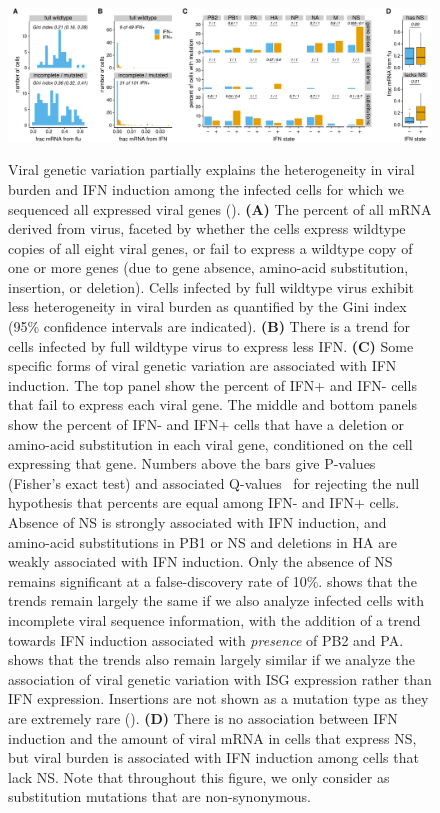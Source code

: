\documentclass[9pt,lineno]{elife}
\begin{document}
\begin{figure}
\begin{fullwidth}
{\centering
\includegraphics[width=\linewidth]{figures/single_cell_figures/p_mutations.pdf}
}
\caption{
Viral genetic variation partially explains the heterogeneity in viral burden and IFN induction among the infected cells for which we sequenced all expressed viral genes ().
{\bf (A)} 
The percent of all mRNA derived from virus, faceted by whether the cells express wildtype copies of all eight viral genes, or fail to express a wildtype copy of one or more genes (due to gene absence, amino-acid substitution, insertion, or deletion).
Cells infected by full wildtype virus exhibit less heterogeneity in viral burden as quantified by the Gini index (95\% confidence intervals are indicated).
{\bf (B)}
There is a trend for cells infected by full wildtype virus to express less IFN.
{\bf (C)}
Some specific forms of viral genetic variation are associated with IFN induction.
The top panel show the percent of IFN+ and IFN- cells that fail to express each viral gene.
The middle and bottom panels show the percent of IFN- and IFN+ cells that have a deletion or amino-acid substitution in each viral gene, conditioned on the cell expressing that gene.
Numbers above the bars give P-values (Fisher's exact test) and associated Q-values~\citep{storey2003statistical} for rejecting the null hypothesis that percents are equal among IFN- and IFN+ cells. 
Absence of NS is strongly associated with IFN induction, and amino-acid substitutions in PB1 or NS and deletions in HA are weakly associated with IFN induction.
Only the absence of NS remains significant at a false-discovery rate of 10\%.
 shows that the trends remain largely the same if we also analyze infected cells with incomplete viral sequence information, with the addition of a trend towards IFN induction associated with \emph{presence} of PB2 and PA. 
 shows that the trends also remain largely similar if we analyze the association of viral genetic variation with ISG expression rather than IFN expression.
Insertions are not shown as a mutation type as they are extremely rare ().
{\bf (D)}
There is no association between IFN induction and the amount of viral mRNA in cells that express NS, but viral burden is associated with IFN induction among cells that lack NS.
Note that throughout this figure, we only consider as substitution mutations that are non-synonymous.
}
\label{fig:mutations}


\end{fullwidth}
\end{figure}
\end{document}
